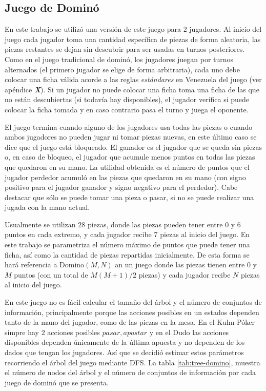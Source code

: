 \subsection*{Juego de Dominó}
En este trabajo se utilizó una versión de este juego para $2$ jugadores. Al inicio del juego cada jugador toma una cantidad específica de piezas de forma aleatoria, las piezas restantes se dejan sin descubrir para ser usadas en turnos posteriores. Como en el juego tradicional de dominó, los jugadores juegan por turnos alternados (el primero jugador se elige de forma arbitraria), cada uno debe colocar una ficha válida acorde a las reglas \textit{estándares} en Venezuela del juego (ver apéndice \textit{\textbf{X}}). Si un jugador no puede colocar una ficha toma una ficha de las que no están descubiertas (si todavía hay disponibles), el jugador verifica si puede colocar la ficha tomada y en caso contrario pasa el turno y juega el oponente.

El juego termina cuando alguno de los jugadores usa todas las piezas o cuando ambos jugadores no pueden jugar ni tomar piezas nuevas, en este último caso se dice que el juego está bloqueado. El ganador es el jugador que se queda sin piezas o, en caso de bloqueo, el jugador que acumule menos puntos en todas las piezas que quedaron en su mano. La utilidad obtenida es el número de puntos que el jugador perdedor acumuló en las piezas que quedaron en su mano (con signo positivo para el jugador ganador y signo negativo para el perdedor). Cabe destacar que sólo se puede tomar una pieza o pasar, si no se puede realizar una jugada con la mano actual.

Usualmente se utilizan $28$ piezas, donde las piezas pueden tener entre $0$ y $6$ puntos en cada extremo, y cada jugador recibe $7$ piezas al inicio del juego. En este trabajo se parametriza el número máximo de puntos que puede tener una ficha, así como la cantidad de piezas repartidas inicialmente. De esta forma se hará referencia a Domino$(M, N)$ an un juego donde las piezas tienen entre $0$ y $M$ puntos (con un total de $M(M+1)/2$ piezas) y cada jugador recibe $N$ piezas al inicio del juego.

En este juego no es fácil calcular el tamaño del árbol y el número de conjuntos de información, principalmente porque las acciones posibles en un estados dependen tanto de la mano del jugador, como de las piezas en la mesa. En el Kuhn Póker simpre hay $2$ acciones posibles ${pasar, apostar}$ y en el Dudo las acciones disponibles dependen únicamente de la última apuesta y no dependen de los dados que tengan los jugadores. Así que se decidió estimar estos parámetros recorriendo el árbol del juego mediante DFS. La tabla \ref{tab:tree-domino}, muestra el número de nodos del árbol y el número de conjuntos de información por cada juego de dominó que se presenta.

